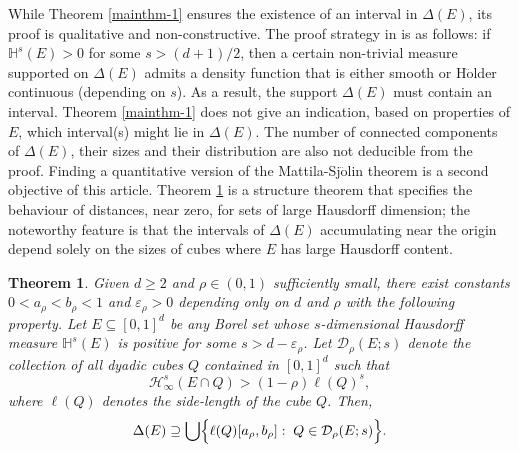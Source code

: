 \documentclass[a4paper,11pt]{amsart}
\newtheorem{thm}{\bf Theorem}[section]
\numberwithin{equation}{section}
\begin{document}
\noindent While Theorem \ref{mainthm-1} ensures the existence of an interval in $\Delta(E)$, its proof is qualitative and non-constructive. The proof strategy in \cite{Mattila-Sjolin-99} is as follows: if $\mathbb H^s(E) > 0$ for some $s > (d+1)/2$, then a certain non-trivial measure supported on $\Delta(E)$ admits a density function that is either smooth or H$\ddot{\text{o}}$lder continuous (depending on $s$). As a result, the support $\Delta(E)$ must contain an interval. Theorem \ref{mainthm-1} does not give an indication, based on properties of $E$, which interval(s) might lie in $\Delta(E)$. The number of connected components of $\Delta(E)$, their sizes and their distribution are also not deducible from the proof. Finding a quantitative version of the Mattila-Sj$\ddot{\text{o}}$lin theorem is a second objective of this article. Theorem \ref{mainthm-cor} is a structure theorem that specifies the behaviour of distances, near zero, for sets of large Hausdorff dimension; the noteworthy feature is that the intervals of $\Delta(E)$ accumulating near the origin depend solely on the sizes of cubes where $E$ has large Hausdorff content. 
\begin{thm} \label{mainthm-cor} 
Given $d \geq 2$ and $\rho \in (0,1)$ sufficiently small, there exist constants $0 < a_{\rho} < b_{\rho}<1$ and $\varepsilon_{\rho} > 0$ depending only on $d$ and $\rho$ with the following property.  
\vskip0.1in
\noindent Let $E \subseteq [0,1]^d$ be any Borel set whose $s$-dimensional Hausdorff measure $\mathbb H^s(E)$ is positive for some $s > d - \varepsilon_{\rho}$. Let $\mathcal D_{\rho}(E; s)$ denote the collection of all dyadic cubes $Q$ contained in $[0,1]^d$ such that  
\begin{equation} \mathcal H_{\infty}^{s}(E \cap Q) > (1 - \rho) \ell(Q)^s,
 \label{high-density-on-cube}
\end{equation} 
where $\ell(Q)$ denotes the side-length of the cube $Q$. Then, 
 \begin{equation}
 \label{Delta-intervals} \Delta(E) \supseteq 
 \bigcup \Bigl\{\ell(Q)[a_{\rho},b_{\rho}]: \; Q \in \mathcal D_{\rho}(E;s) \Bigr\}.   
 \end{equation}  
\end{thm} 
\end{document}
